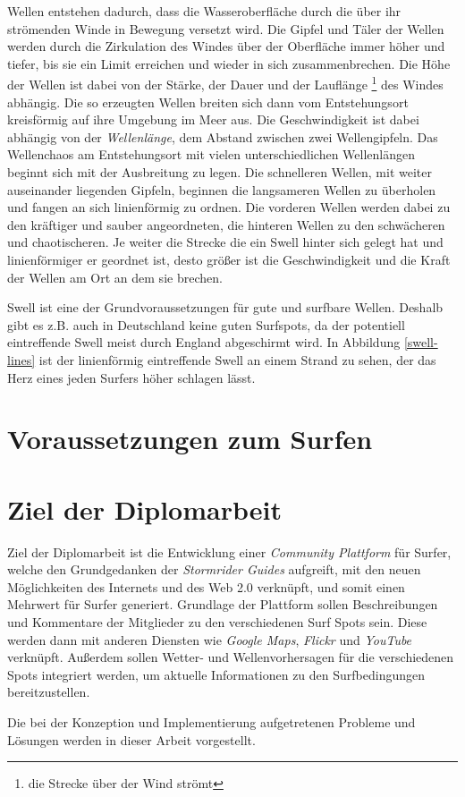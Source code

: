 Wellen entstehen dadurch, dass die Wasseroberfläche durch die über ihr
strömenden Winde in Bewegung versetzt wird. Die Gipfel und Täler der
Wellen werden durch die Zirkulation des Windes über der Oberfläche
immer höher und tiefer, bis sie ein Limit erreichen und wieder in sich
zusammenbrechen. Die Höhe der Wellen ist dabei von der Stärke, der
Dauer und der Lauflänge \footnote{die Strecke über der Wind strömt}
des Windes abhängig. Die so erzeugten Wellen breiten sich dann vom
Entstehungsort kreisförmig auf ihre Umgebung im Meer aus. Die
Geschwindigkeit ist dabei abhängig von der \textit{Wellenlänge}, dem
Abstand zwischen zwei Wellengipfeln. Das Wellenchaos am Entstehungsort
mit vielen unterschiedlichen Wellenlängen beginnt sich mit der
Ausbreitung zu legen. Die schnelleren Wellen, mit weiter auseinander
liegenden Gipfeln, beginnen die langsameren Wellen zu überholen und
fangen an sich linienförmig zu ordnen. Die vorderen Wellen werden
dabei zu den kräftiger und sauber angeordneten, die hinteren Wellen zu
den schwächeren und chaotischeren. Je weiter die Strecke die ein Swell
hinter sich gelegt hat und linienförmiger er geordnet ist, desto
größer ist die Geschwindigkeit und die Kraft der Wellen am Ort an dem
sie brechen.

Swell ist eine der Grundvoraussetzungen für gute und surfbare
Wellen. Deshalb gibt es z.B. auch in Deutschland keine guten
Surfspots, da der potentiell eintreffende Swell meist durch England
abgeschirmt wird. In Abbildung \ref{swell-lines} ist der linienförmig
eintreffende Swell an einem Strand zu sehen, der das Herz eines jeden
Surfers höher schlagen lässt.

\section{Voraussetzungen zum Surfen}

\section{Ziel der Diplomarbeit}

Ziel der Diplomarbeit ist die Entwicklung einer \textit{Community
  Plattform} für Surfer, welche den Grundgedanken der
\textit{Stormrider Guides} aufgreift, mit den neuen Möglichkeiten des
Internets und des Web 2.0 verknüpft, und somit einen Mehrwert für
Surfer generiert. Grundlage der Plattform sollen Beschreibungen und
Kommentare der Mitglieder zu den verschiedenen Surf Spots sein. Diese
werden dann mit anderen Diensten wie \textit{Google Maps},
\textit{Flickr} und \textit{YouTube} verknüpft. Außerdem sollen
Wetter- und Wellenvorhersagen für die verschiedenen Spots integriert
werden, um aktuelle Informationen zu den Surfbedingungen
bereitzustellen.

Die bei der Konzeption und Implementierung aufgetretenen Probleme und
Lösungen werden in dieser Arbeit vorgestellt.


